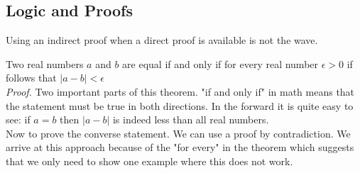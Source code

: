 \subsection{Logic and Proofs}
Using an indirect proof when a direct proof is available is not the wave. 
\begin{theorem}
	Two real numbers $ a $ and $ b $ are equal if and only if for every real number $ \epsilon > 0$ if follows that $ |a-b| < \epsilon $ \\
	\textit{Proof.} Two important parts of this theorem. "if and only if" in math means that the statement must be true in both directions. In the forward it is quite easy to see: if $ a = b $ then $ |a-b| $ is indeed less than all real numbers. \\
	Now to prove the converse statement. We can use a proof by contradiction. We arrive at this approach because of the "for every" in the theorem which suggests that we only need to show one example where this does not work. 
\end{theorem}